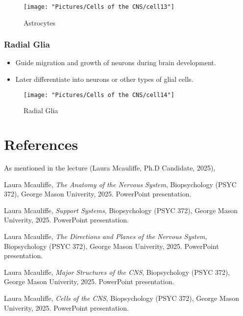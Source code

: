 \documentclass[12pt,a4paper]{article}
\begin{document}
\begin{figure}
	\centering
	\texttt{[image: "Pictures/Cells of the CNS/cell13"]}
	\caption{Astrocytes}
	\label{fig:cell13}
\end{figure}
	
	
	\subsubsection{Radial Glia}
	
	\begin{itemize}
		\item Guide migration and growth of neurons during brain development. 
		\item Later differentiate into neurons or other types of glial cells. 
	\end{itemize}
	
\begin{figure}
	\centering
	\texttt{[image: "Pictures/Cells of the CNS/cell14"]}
	\caption{Radial Glia}
	\label{fig:cell14}
\end{figure}
	
	\section{References}
	
	As mentioned in the lecture (Laura Mcauliffe, Ph.D Candidate, 2025),
	
	\begin{thebibliography}{9}
		Laura Mcauliffe, \emph{The Anatomy of the Nervous System}, Biopsychology (PSYC 372), George Mason Univerity, 2025. PowerPoint presentation.

		Laura Mcauliffe, \emph{Support Systems}, Biopsychology (PSYC 372), George Mason Univerity, 2025. PowerPoint presentation.

		Laura Mcauliffe, \emph{The Directions and Planes of the Nervous System}, Biopsychology (PSYC 372), George Mason Univerity, 2025. PowerPoint presentation.

		Laura Mcauliffe, \emph{Major Structures of the CNS}, Biopsychology (PSYC 372), George Mason Univerity, 2025. PowerPoint presentation.

		Laura Mcauliffe, \emph{Cells of the CNS}, Biopsychology (PSYC 372), George Mason Univerity, 2025. PowerPoint presentation.
	\end{thebibliography}
	
\end{document}
